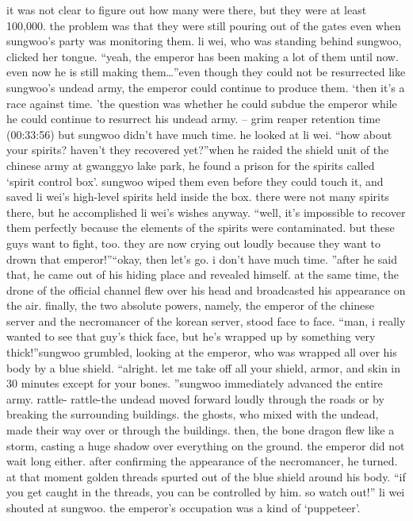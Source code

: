  it was not clear to figure out how many were there, but they were at least 100,000.
 the problem was that they were still pouring out of the gates even when sungwoo’s party was monitoring them.
li wei, who was standing behind sungwoo, clicked her tongue.
“yeah, the emperor has been making a lot of them until now.
 even now he is still making them…”even though they could not be resurrected like sungwoo’s undead army, the emperor could continue to produce them.
‘then it’s a race against time.
’the question was whether he could subdue the emperor while he could continue to resurrect his undead army.
– grim reaper retention time (00:33:56)
but sungwoo didn’t have much time.
 he looked at li wei.
“how about your spirits? haven’t they recovered yet?”when he raided the shield unit of the chinese army at gwanggyo lake park, he found a prison for the spirits called ‘spirit control box’.
 sungwoo wiped them even before they could touch it, and saved li wei’s high-level spirits held inside the box.
 there were not many spirits there, but he accomplished li wei’s wishes anyway.
“well, it’s impossible to recover them perfectly because the elements of the spirits were contaminated.
 but these guys want to fight, too.
 they are now crying out loudly because they want to drown that emperor!”“okay, then let’s go.
 i don’t have much time.
”after he said that, he came out of his hiding place and revealed himself.
at the same time, the drone of the official channel flew over his head and broadcasted his appearance on the air.
finally, the two absolute powers, namely, the emperor of the chinese server and the necromancer of the korean server, stood face to face.
“man, i really wanted to see that guy’s thick face, but he’s wrapped up by something very thick!”sungwoo grumbled, looking at the emperor, who was wrapped all over his body by a blue shield.
“alright.
 let me take off all your shield, armor, and skin in 30 minutes except for your bones.
”sungwoo immediately advanced the entire army.
rattle- rattle-the undead moved forward loudly through the roads or by breaking the surrounding buildings.
the ghosts, who mixed with the undead, made their way over or through the buildings.
then, the bone dragon flew like a storm, casting a huge shadow over everything on the ground.
the emperor did not wait long either.
after confirming the appearance of the necromancer, he turned.
 at that moment golden threads spurted out of the blue shield around his body.
“if you get caught in the threads, you can be controlled by him.
 so watch out!” li wei shouted at sungwoo.
the emperor’s occupation was a kind of ‘puppeteer’.
